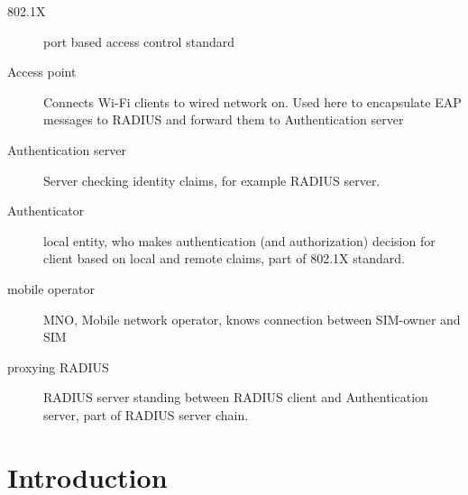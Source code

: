 \documentclass[12pt,a4paper,english]{tutthesis}
\begin{document}
\begin{otherlanguage}{english}
\newpage

\begin{description}
\item[{802.1X}] port based access control standard
\item[{Access point}] Connects Wi-Fi clients to wired network on. Used
here to encapsulate EAP messages to RADIUS and
forward them to Authentication server
\end{description}
\begin{description}
\item[{Authentication server}] Server checking identity claims, for
example RADIUS server.
\item[{Authenticator}] local entity, who makes authentication (and
authorization) decision for client based on local and remote
claims, part of 802.1X standard.
\end{description}
\begin{description}
\item[{mobile operator}] MNO, Mobile network operator, knows connection between SIM-owner and SIM
\end{description}
\begin{description}
\item[{proxying RADIUS}] RADIUS server standing between RADIUS
client and Authentication server, part of RADIUS server chain.
\end{description}



\if@twoside
\cleardoublepage
\fi

\newpage             %
\setcounter{page}{1} %
\renewcommand{\chaptername}{} %

\chapter{Introduction}
\label{sec-1}
\label{cha:intro}



\end{otherlanguage}
\end{document}
